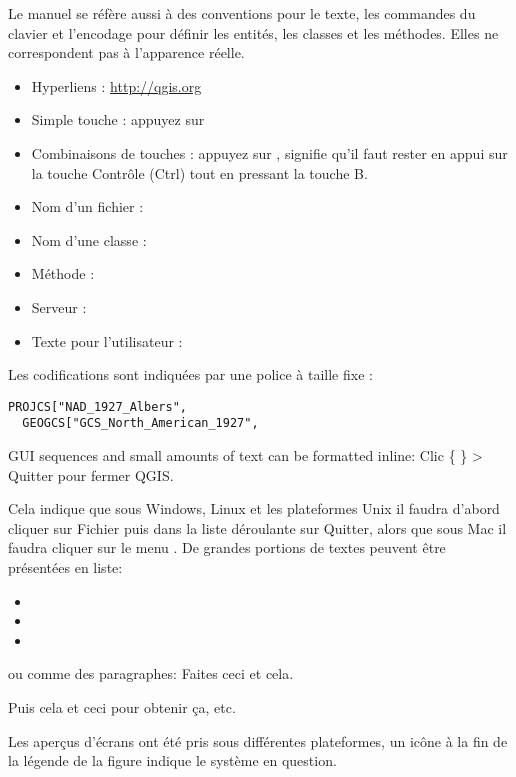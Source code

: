 
Le manuel se réfère aussi à des conventions pour le texte, les commandes du clavier et l'encodage pour définir les entités, les classes et les méthodes. Elles ne correspondent pas à l'apparence réelle.

\begin{itemize}[label=--]
\item Hyperliens : \url{http://qgis.org}
\item Simple touche : appuyez sur 
\item Combinaisons de touches : appuyez sur , signifie qu'il faut rester en appui sur la touche Contrôle (Ctrl) tout en pressant la touche B.
\item Nom d'un fichier : 
\item Nom d'une classe : 
\item Méthode : 
\item Serveur : 
\item Texte pour l'utilisateur : 
\end{itemize}

Les codifications sont indiquées par une police à taille fixe :
\begin{verbatim}
PROJCS["NAD_1927_Albers",
  GEOGCS["GCS_North_American_1927",
\end{verbatim}


GUI sequences and small amounts of text can be formatted inline: Clic
\{\nix{} \} > Quitter pour fermer QGIS. 

Cela indique que sous Windows, Linux et les plateformes Unix il faudra d'abord cliquer sur Fichier puis dans la liste déroulante sur Quitter, alors que sous Mac il faudra cliquer sur le menu \qg. De grandes portions de textes peuvent être présentées en liste:

\begin{itemize}[label=--]
\item {}
\item {}
\item {}
\end{itemize}
ou comme des paragraphes:
\vspace{0.5cm}
\nix{} \osx{} Faites ceci et cela.
\par
\vspace{0.5cm}
\win{} Puis cela et ceci pour obtenir ça, etc. 
\par\vspace{0.5cm}
Les aperçus d'écrans ont été pris sous différentes plateformes, un icône à la fin de la légende de la figure indique le système en question.
